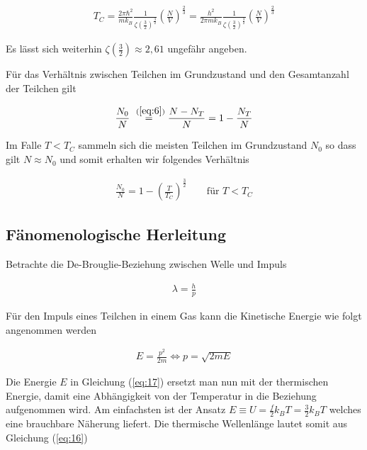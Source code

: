 \begin{align}
  \label{eq:13}
  \boxed{ T_C = \frac{ 2\pi \hbar^2}{m k_B }\frac{1}{\zeta(\frac{3}{2})^{\frac{3}{2}}} \left( \frac{N}{V} \right)^{\frac{2}{3}} 
= \frac{ h^2}{2\pi m k_B }\frac{1}{\zeta(\frac{3}{2})^{\frac{3}{2}}} \left( \frac{N}{V} \right)^{\frac{2}{3}} }
\end{align}

Es lässt sich weiterhin  \( \zeta(\frac{3}{2}) \approx 2,61\) ungefähr angeben.


Für das Verhältnis zwischen Teilchen im Grundzustand und den Gesamtanzahl der Teilchen gilt

\begin{align}
  \label{eq:14}
  \frac{N_0}{N} \stackrel{~(\ref{eq:6})}= \frac{N-N_T} N = 1-\frac {N_T} N 
\end{align}

Im Falle \(T<T_C\) sammeln sich die meisten Teilchen im Grundzustand \(N_0\) so dass gilt \(N\approx N_0\) und somit erhalten wir folgendes Verhältnis

\begin{align}
  \label{eq:15}
 \frac{N_0}{N} = 1 - \left( \frac{T}{T_C}\right)^{\frac{3}{2}} \qquad \text{für } T<T_C
\end{align}


\subsection*{Fänomenologische Herleitung}

Betrachte die De-Brouglie-Beziehung zwischen Welle und Impuls

\begin{align}
  \label{eq:16}
  \lambda = \frac{h}{p}
\end{align}

Für den Impuls eines Teilchen in einem Gas kann die Kinetische Energie wie folgt angenommen werden

\begin{align}
  \label{eq:17}
  E=\frac{p^2}{2m} \Leftrightarrow p = \sqrt{2mE}
\end{align}

Die Energie \(E\) in Gleichung (\ref{eq:17}) ersetzt man nun mit der thermischen Energie, damit eine Abhängigkeit von der Temperatur in die Beziehung aufgenommen wird. Am einfachsten ist der Ansatz \(E\equiv U=\frac{f}{2}k_B T=\frac{3}{2}k_B T\) welches eine brauchbare Näherung liefert. Die thermische Wellenlänge lautet somit aus Gleichung (\ref{eq:16})

